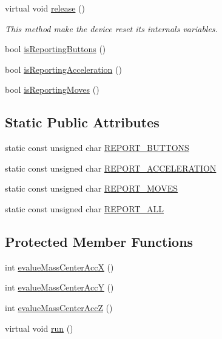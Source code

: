 \begin{DoxyCompactItemize}
virtual void \hyperlink{classbr_1_1ufscar_1_1lince_1_1mmi_1_1wii_1_1WiiMote_a4d17da2514583aa3787a1d9fda1cd74c}{release} ()
\begin{DoxyCompactList}\small\item\em This method make the device reset its internals variables. \item\end{DoxyCompactList}\item 
bool \hyperlink{classbr_1_1ufscar_1_1lince_1_1mmi_1_1wii_1_1WiiMote_aa3b9e2935b6f0fc39b1a08260f3da66d}{isReportingButtons} ()
\item 
bool \hyperlink{classbr_1_1ufscar_1_1lince_1_1mmi_1_1wii_1_1WiiMote_a969959e1b25dd2660e54d1e3acd520a4}{isReportingAcceleration} ()
\item 
bool \hyperlink{classbr_1_1ufscar_1_1lince_1_1mmi_1_1wii_1_1WiiMote_a1eeed1b89ee5cd55fedf9f8c75561ed0}{isReportingMoves} ()
\end{DoxyCompactItemize}
\subsection*{Static Public Attributes}
\begin{DoxyCompactItemize}
\item 
static const unsigned char \hyperlink{classbr_1_1ufscar_1_1lince_1_1mmi_1_1wii_1_1WiiMote_af1e2bc7d7054d1b4dab67e9b278017ce}{REPORT\_\-BUTTONS}
\item 
static const unsigned char \hyperlink{classbr_1_1ufscar_1_1lince_1_1mmi_1_1wii_1_1WiiMote_a31e84ef1eebb0340545dcd1b3bb3a0fc}{REPORT\_\-ACCELERATION}
\item 
static const unsigned char \hyperlink{classbr_1_1ufscar_1_1lince_1_1mmi_1_1wii_1_1WiiMote_a95ac41c7b1b12e770e2adf6f12f48143}{REPORT\_\-MOVES}
\item 
static const unsigned char \hyperlink{classbr_1_1ufscar_1_1lince_1_1mmi_1_1wii_1_1WiiMote_a96872905a37ca4eb5902ea220217a54f}{REPORT\_\-ALL}
\end{DoxyCompactItemize}
\subsection*{Protected Member Functions}
\begin{DoxyCompactItemize}
\item 
int \hyperlink{classbr_1_1ufscar_1_1lince_1_1mmi_1_1wii_1_1WiiMote_aafcb4ce9fbe1af60e2dcc3a4baca239e}{evalueMassCenterAccX} ()
\item 
int \hyperlink{classbr_1_1ufscar_1_1lince_1_1mmi_1_1wii_1_1WiiMote_aa6b36913433189b48dc26595bb0f91dc}{evalueMassCenterAccY} ()
\item 
int \hyperlink{classbr_1_1ufscar_1_1lince_1_1mmi_1_1wii_1_1WiiMote_a0c49aa47a11e98f20fa720603a20c14f}{evalueMassCenterAccZ} ()
\item 
virtual void \hyperlink{classbr_1_1ufscar_1_1lince_1_1mmi_1_1wii_1_1WiiMote_ae0f3e542c2d18e7a09c2beb09562a7d4}{run} ()
\end{DoxyCompactItemize}


